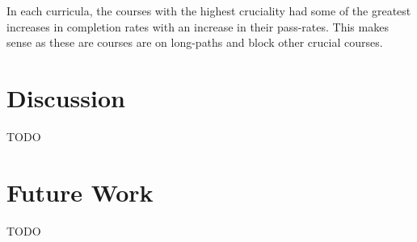 \documentclass[botnum, fleqn]{unmeethesis}
\begin{document}
    In each curricula, the courses with the highest cruciality had some of the greatest increases in completion rates with an increase in their pass-rates. This makes sense as these are courses are on long-paths and block other crucial courses. 

\chapter{Discussion}
TODO

\chapter{Future Work}
TODO

\vspace{4\baselineskip}\vspace{-\parskip} %
\footnotesize %

\end{document}
